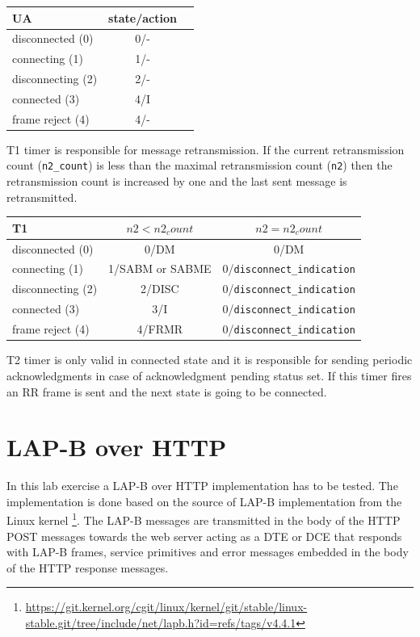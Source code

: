 \documentclass[a4paper]{article}
\begin{document}
{\footnotesize
\begin{center}
\begin{tabular}{|l|c|c|}
\hline
 UA & state/action \\
\hline
 disconnected (0)& 0/- \\
\hline
 connecting (1) & 1/- \\
\hline
 disconnecting (2) & 2/- \\
\hline
 connected (3) & 4/I  \\
\hline
 frame reject (4) & 4/- \\
\hline
\end{tabular}
\end{center}
}

T1 timer is responsible for message retransmission. If the current retransmission count (\verb!n2_count!) is less than the maximal retransmission count (\verb!n2!) then the retransmission count is increased by one and the last sent message is retransmitted.

{\footnotesize
\begin{center}
\begin{tabular}{|l|c|c|}
\hline
 T1 &$n2 < n2_count$&$n2 = n2_count$\\
\hline
 disconnected (0)& 0/DM & 0/DM\\
\hline
 connecting (1) & 1/SABM or SABME & 0/\verb!disconnect_indication! \\
\hline
 disconnecting (2) & 2/DISC & 0/\verb!disconnect_indication!\\
\hline
 connected (3) & 3/I& 0/\verb!disconnect_indication!\\
\hline
 frame reject (4) & 4/FRMR & 0/\verb!disconnect_indication!\\
\hline
\end{tabular}
\end{center}
}

T2 timer is only valid in connected state and it is responsible for sending periodic acknowledgments in case of acknowledgment pending status set. If this timer fires an RR frame is sent and the next state is going to be connected.

\section{LAP-B over HTTP}

In this lab exercise a LAP-B over HTTP implementation has to be tested. The implementation is done based on the source of LAP-B implementation from the Linux kernel  \footnote{\url{https://git.kernel.org/cgit/linux/kernel/git/stable/linux-stable.git/tree/include/net/lapb.h?id=refs/tags/v4.4.1}}. The LAP-B messages are transmitted in the body of the HTTP POST messages towards the web server acting as a DTE or DCE that responds with LAP-B frames, service primitives and error messages embedded in the body of the HTTP response messages.
\end{document}
